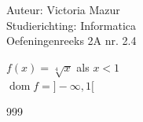 \documentclass[a4paper]{article}
\begin{document}
  
\noindent \large Auteur: Victoria Mazur \\
\noindent \large Studierichting: Informatica\\
\noindent \large Oefeningenreeks 2A nr. 2.4\\

\medskip

\normalsize

$f(x) = \sqrt[4]{x}$ als $x < 1$ \\

$\operatorname{dom} f = ]-\infty, 1[$ \\

\begin{thebibliography}{999}
\end{thebibliography}
\end{document}
